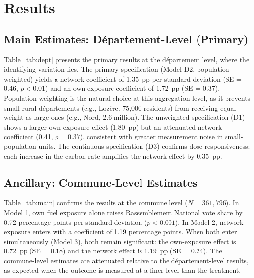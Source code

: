 \documentclass[12pt]{article}
\providecommand{\euro}{\texteuro}
\newcommand{\rn}{Rassemblement National}
\newcommand{\dept}{d\'{e}partement}
\newcommand{\depts}{d\'{e}partements}
\begin{document}

\section{Results}
\label{sec:results}

\subsection{Main Estimates: D\'{e}partement-Level (Primary)}

Table~\ref{tab:dept} presents the primary results at the \dept{} level, where the identifying variation lies. The primary specification (Model D2, population-weighted) yields a network coefficient of 1.35~pp per standard deviation (SE = 0.46, $p < 0.01$) and an own-exposure coefficient of 1.72~pp (SE = 0.37). Population weighting is the natural choice at this aggregation level, as it prevents small rural \depts{} (e.g., Loz\`{e}re, 75,000 residents) from receiving equal weight as large ones (e.g., Nord, 2.6 million). The unweighted specification (D1) shows a larger own-exposure effect (1.80~pp) but an attenuated network coefficient (0.41, $p = 0.37$), consistent with greater measurement noise in small-population units. The continuous specification (D3) confirms dose-responsiveness: each \euro 10 increase in the carbon rate amplifies the network effect by 0.35~pp.

\subsection{Ancillary: Commune-Level Estimates}

Table~\ref{tab:main} confirms the results at the commune level ($N = 361{,}796$). In Model 1, own fuel exposure alone raises \rn{} vote share by 0.72 percentage points per standard deviation ($p < 0.001$). In Model 2, network exposure enters with a coefficient of 1.19 percentage points. When both enter simultaneously (Model 3), both remain significant: the own-exposure effect is 0.72~pp (SE = 0.18) and the network effect is 1.19~pp (SE = 0.24). The commune-level estimates are attenuated relative to the \dept{}-level results, as expected when the outcome is measured at a finer level than the treatment.
\end{document}
